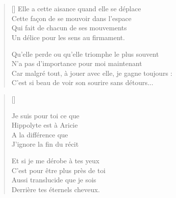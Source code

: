 \section{\hfill}

\settowidth{\versewidth}{Car malgré tout, à jouer avec elle, je gagne toujours :}
\begin{verse}[\versewidth]
Elle a cette aisance quand elle se déplace \\
Cette façon de se mouvoir dans l'espace \\
Qui fait de chacun de ses mouvements \\
Un délice pour les sens au firmament.

Qu'elle perde ou qu'elle triomphe le plus souvent \\
N'a pas d'importance pour moi maintenant \\
Car malgré tout, à jouer avec elle, je gagne toujours : \\
C'est si beau de voir son sourire sans détours...
\end{verse}


\settowidth{\versewidth}{C'est pour être plus près de toi}
\begin{verse}[\versewidth]


Je suis pour toi ce que \\
Hippolyte est à Aricie \\
A la différence que \\
J'ignore la fin du récit


Et si je me dérobe à tes yeux \\
C'est pour être plus près de toi \\
Aussi translucide que je sois \\
Derrière tes éternels cheveux.
\end{verse}

